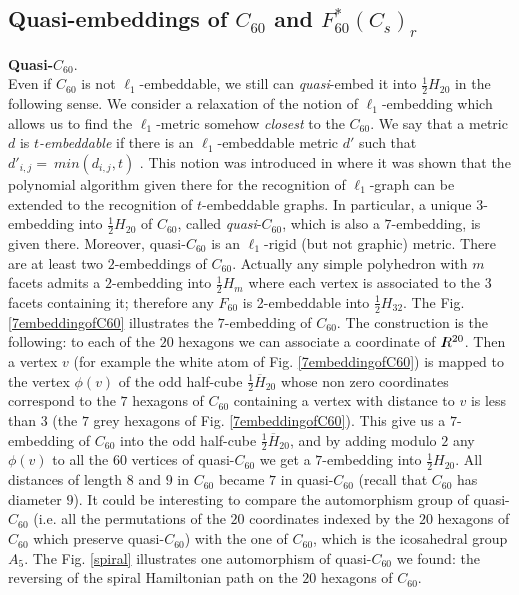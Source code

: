 \subsection{Quasi-embeddings of $C_{60}$ and $F^*_{60}(C_s)_r$}
{\bf Quasi-$C_{60}$}.\\
Even if $C_{60}$ is not $\ell_1$-embeddable, we still can {\em quasi}-embed it 
into $\frac{1}{2}H_{20}$ in the
following sense. We consider a relaxation of the notion of $\ell_1$-embedding
which allows us to find the
$\ell_1$-metric somehow {\em closest} to the $C_{60}$. We say that a metric $d$ 
is {\em $t$-embeddable} if there is
an $\ell_1$-embeddable metric $d'$ such that $d'_{i,j}=\:min(d_{i,j},t)$ .
This notion was introduced in \cite{ds96} where it was shown  that the
polynomial algorithm given there for the recognition
of $\ell_1$-graph can be extended to the recognition of $t$-embeddable graphs.
In particular, a unique $3$-embedding into $\frac{1}{2}H_{20}$ of $C_{60}$,
called {\em quasi}-$C_{60}$, which is also a $7$-embedding, is given there.
Moreover, quasi-$C_{60}$ is an $\ell_1$-rigid (but not graphic) metric.
There are at least two $2$-embeddings of $C_{60}$. Actually any simple 
polyhedron with $m$ facets admits a $2$-embedding into $\frac{1}{2}H_m$
where each vertex is associated to the 3 facets containing it; therefore
any $F_{60}$ is 2-embeddable into $\frac{1}{2}H_{32}$. The Fig. \ref{7embeddingofC60} illustrates the $7$-embedding of $C_{60}$.
The construction is the following: to each of the $20$ hexagons we can associate a coordinate of
$I\hspace{-1.7mm}R^{20}$. Then a vertex $v$ (for example the white atom of Fig.
\ref{7embeddingofC60})
is mapped to the vertex $\phi(v)$ of the odd half-cube $\frac{1}{2}\overline{H}_{20}$  whose
non zero coordinates correspond to the $7$ hexagons of $C_{60}$
containing a vertex with distance to $v$ is
less than $3$ (the $7$ grey hexagons of Fig. \ref{7embeddingofC60}). This
give us a $7$-embedding of $C_{60}$ into the odd half-cube
$\frac{1}{2}\overline{H}_{20}$, and by adding modulo $2$ any $\phi(v)$ to all
the $60$ vertices of quasi-$C_{60}$ we get a $7$-embedding into $\frac{1}{2}H_{20}$.
All distances of length $8$ and $9$ in $C_{60}$ became $7$ in quasi-$C_{60}$
(recall that $C_{60}$ has diameter $9$). It could be interesting to compare the
automorphism group of quasi-$C_{60}$ (i.e. all the permutations of the $20$ coordinates indexed by
the $20$ hexagons
of $C_{60}$ which preserve quasi-$C_{60}$) with the one of $C_{60}$, which is the 
icosahedral group $A_5$.
The Fig. \ref{spiral} illustrates one automorphism of quasi-$C_{60}$ we found: the reversing of the
spiral Hamiltonian path on the $20$ hexagons of $C_{60}$.

